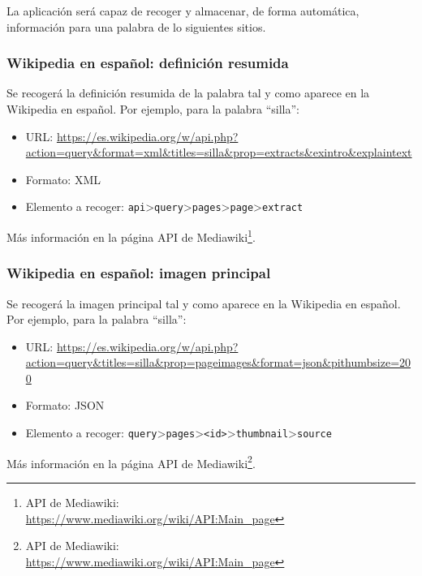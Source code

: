 La aplicación será capaz de recoger y almacenar, de forma automática, información para una palabra de lo siguientes sitios.


\subsubsection{Wikipedia en español: definición resumida}

Se recogerá la definición resumida de la palabra tal y como aparece en la Wikipedia en español. Por ejemplo, para la palabra ``silla'':

\begin{itemize}
\item URL: \url{https://es.wikipedia.org/w/api.php?action=query&format=xml&titles=silla&prop=extracts&exintro&explaintext}
\item Formato: XML
\item Elemento a recoger: \texttt{api}>\texttt{query}>\texttt{pages}>\texttt{page}>\texttt{extract} 
\end{itemize}

Más información en la página API de Mediawiki\footnote{API de Mediawiki: \\ \url{https://www.mediawiki.org/wiki/API:Main_page}}.

\subsubsection{Wikipedia en español: imagen principal}

Se recogerá la imagen principal tal y como aparece en la Wikipedia en español. Por ejemplo, para la palabra ``silla'':

\begin{itemize}
\item URL: \url{https://es.wikipedia.org/w/api.php?action=query&titles=silla&prop=pageimages&format=json&pithumbsize=200}
\item Formato: JSON
\item Elemento a recoger: \texttt{query}>\texttt{pages}>\texttt{<id>}>\texttt{thumbnail}>\texttt{source}
\end{itemize}

Más información en la página API de Mediawiki\footnote{API de Mediawiki: \\ \url{https://www.mediawiki.org/wiki/API:Main_page}}.

